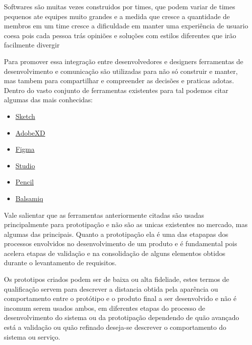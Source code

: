   Softwares são muitas vezes construidos por times, que podem variar de times pequenos ate equipes muito grandes e a medida que cresce a quantidade de membros em um time cresce a dificuldade em manter uma experiência de usuario coesa pois cada pessoa trás opiniões e soluções com estilos diferentes que irão facilmente divergir \cite{airbnb_medium}

  Para promover essa integração entre desenvolvedores e designers ferramentas de desenvolvimento e comunicação são utilizadas para não só construir e manter, mas tambem para compartilhar e compreender as decisões e praticas adotas. Dentro do vasto conjunto de ferramentas existentes para tal podemos citar algumas das mais conhecidas:

\begin{itemize}
  \item \href{https://www.sketch.com}{Sketch}
  \item \href{https://www.adobe.com/br/products/xd.html?promoid=3NQZBBTZ&mv=other}{AdobeXD}
  \item \href{https://www.figma.com/}{Figma}
  \item \href{https://www.invisionapp.com/studio}{Studio}
  \item \href{https://pencil.evolus.vn/}{Pencil}
  \item \href{https://balsamiq.com/wireframes/}{Balsamiq}
\end{itemize}

  Vale salientar que as ferramentas anteriormente citadas são usadas principalmente para prototipação e não são as unicas existentes no mercado, mas algumas das principais. Quanto a prototipação ela é uma das etapapas dos processos envolvidos no desenvolvimento de um produto e é fundamental pois acelera etapas de validação e na consolidação de alguns elementos obtidos durante o levantamento de requisitos.

  Os prototipos criados podem ser de baixa ou alta fideliade, estes termos de qualificação servem para descrever a distancia obtida pela aparência ou comportamento entre o protótipo e o produto final a ser desenvolvido e não é incomum serem usados ambos, em diferentes etapas do processo de desenvolvimento do sistema ou da prototipação dependendo de quão avançado está a validação ou quão refinado deseja-se descrever o comportamento do sistema ou serviço.

